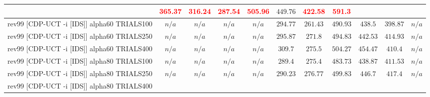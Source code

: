 \documentclass{article}
\begin{document}
\begin{tabular}{|l|r@{$\pm$}rr@{$\pm$}rr@{$\pm$}rr@{$\pm$}rr@{$\pm$}rr@{$\pm$}rr@{$\pm$}rr@{$\pm$}rr@{$\pm$}rr@{$\pm$}r|}
& \multicolumn{2}{c}{\textbf{\textcolor{red}{365.37}}}
& \multicolumn{2}{c}{\textbf{\textcolor{red}{316.24}}}
& \multicolumn{2}{c}{\textbf{\textcolor{red}{287.54}}}
& \multicolumn{2}{c}{\textbf{\textcolor{red}{505.96}}}
& \multicolumn{2}{c}{$449.76$}
& \multicolumn{2}{c}{\textbf{\textcolor{red}{422.58}}}
& \multicolumn{2}{c|}{\textbf{\textcolor{red}{591.3}}}
\\
\hline
rev99 [CDP-UCT -i [IDS]] alpha60 TRIALS100
& \multicolumn{2}{c}{\textbf{$n/a$}}
& \multicolumn{2}{c}{\textbf{$n/a$}}
& \multicolumn{2}{c}{\textbf{$n/a$}}
& \multicolumn{2}{c}{\textbf{$n/a$}}
& \multicolumn{2}{c}{$294.77$}
& \multicolumn{2}{c}{$261.43$}
& \multicolumn{2}{c}{$490.93$}
& \multicolumn{2}{c}{$438.5$}
& \multicolumn{2}{c}{$398.87$}
& \multicolumn{2}{c|}{\textbf{$n/a$}}
\\
rev99 [CDP-UCT -i [IDS]] alpha60 TRIALS250
& \multicolumn{2}{c}{\textbf{$n/a$}}
& \multicolumn{2}{c}{\textbf{$n/a$}}
& \multicolumn{2}{c}{\textbf{$n/a$}}
& \multicolumn{2}{c}{\textbf{$n/a$}}
& \multicolumn{2}{c}{$295.87$}
& \multicolumn{2}{c}{$271.8$}
& \multicolumn{2}{c}{$494.83$}
& \multicolumn{2}{c}{$442.53$}
& \multicolumn{2}{c}{$414.93$}
& \multicolumn{2}{c|}{\textbf{$n/a$}}
\\
rev99 [CDP-UCT -i [IDS]] alpha60 TRIALS400
& \multicolumn{2}{c}{\textbf{$n/a$}}
& \multicolumn{2}{c}{\textbf{$n/a$}}
& \multicolumn{2}{c}{\textbf{$n/a$}}
& \multicolumn{2}{c}{\textbf{$n/a$}}
& \multicolumn{2}{c}{$309.7$}
& \multicolumn{2}{c}{$275.5$}
& \multicolumn{2}{c}{\textbf{$504.27$}}
& \multicolumn{2}{c}{\textbf{$454.47$}}
& \multicolumn{2}{c}{$410.4$}
& \multicolumn{2}{c|}{\textbf{$n/a$}}
\\
rev99 [CDP-UCT -i [IDS]] alpha80 TRIALS100
& \multicolumn{2}{c}{\textbf{$n/a$}}
& \multicolumn{2}{c}{\textbf{$n/a$}}
& \multicolumn{2}{c}{\textbf{$n/a$}}
& \multicolumn{2}{c}{\textbf{$n/a$}}
& \multicolumn{2}{c}{$289.4$}
& \multicolumn{2}{c}{$275.4$}
& \multicolumn{2}{c}{$483.73$}
& \multicolumn{2}{c}{$438.87$}
& \multicolumn{2}{c}{$411.53$}
& \multicolumn{2}{c|}{\textbf{$n/a$}}
\\
rev99 [CDP-UCT -i [IDS]] alpha80 TRIALS250
& \multicolumn{2}{c}{\textbf{$n/a$}}
& \multicolumn{2}{c}{\textbf{$n/a$}}
& \multicolumn{2}{c}{\textbf{$n/a$}}
& \multicolumn{2}{c}{\textbf{$n/a$}}
& \multicolumn{2}{c}{$290.23$}
& \multicolumn{2}{c}{$276.77$}
& \multicolumn{2}{c}{\textbf{$499.83$}}
& \multicolumn{2}{c}{$446.7$}
& \multicolumn{2}{c}{$417.4$}
& \multicolumn{2}{c|}{\textbf{$n/a$}}
\\
rev99 [CDP-UCT -i [IDS]] alpha80 TRIALS400

\end{tabular}
\end{document}
